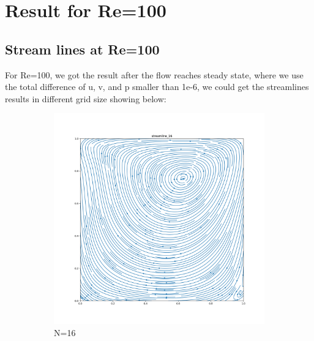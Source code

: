\documentclass[12pt]{article}
\begin{document}
\newpage
\section{Result for Re=100}
\subsection{Stream lines at Re=100}
For Re=100, we got the result after the flow reaches steady state, where we use the total difference of u, v, and p smaller than 1e-6, we could get the streamlines results in different grid size showing below:
\begin{figure}[H]
    \centering
    \begin{subfigure}[b]{0.48\linewidth}
        \includegraphics[width=\linewidth]{figures/Re=100_result/streamline_16.png}
        \caption{N=16}
    \end{subfigure}
    \hspace{-5mm} %
    \begin{subfigure}[b]{0.48\linewidth}

\end{subfigure}
\end{figure}
\end{document}
